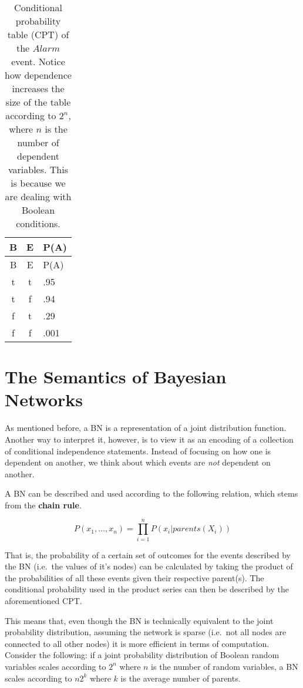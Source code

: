 \documentclass[
]{book}
\begin{document}
\hypertarget{tbl:cpt}{}
\begin{longtable}[]{@{}ccl@{}}
\caption{\label{tbl:cpt}Conditional probability table (CPT) of the
\(Alarm\) event. Notice how dependence increases the size of the table
according to \(2^n\), where \(n\) is the number of dependent variables.
This is because we are dealing with Boolean conditions.}\tabularnewline
\toprule\noalign{}
B & E & P(A) \\
\midrule\noalign{}
\endfirsthead
\toprule\noalign{}
B & E & P(A) \\
\midrule\noalign{}
\endhead
\bottomrule\noalign{}
\endlastfoot
t & t & .95 \\
t & f & .94 \\
f & t & .29 \\
f & f & .001 \\
\end{longtable}

\hypertarget{the-semantics-of-bayesian-networks}{%
\section{The Semantics of Bayesian
Networks}\label{the-semantics-of-bayesian-networks}}

As mentioned before, a BN is a representation of a joint distribution
function. Another way to interpret it, however, is to view it as an
encoding of a collection of conditional independence statements. Instead
of focusing on how one is dependent on another, we think about which
events are \emph{not} dependent on another.

A BN can be described and used according to the following relation,
which stems from the \textbf{chain rule}.

\[
P(x_1, \ldots, x_n) = \prod^n_{i=1} P(x_i|parents(X_i))
\]

That is, the probability of a certain set of outcomes for the events
described by the BN (i.e.~the values of it's nodes) can be calculated by
taking the product of the probabilities of all these events given their
respective parent(s). The conditional probability used in the product
series can then be described by the aforementioned CPT.

This means that, even though the BN is technically equivalent to the
joint probability distribution, assuming the network is sparse (i.e.~not
all nodes are connected to all other nodes) it is more efficient in
terms of computation. Consider the following: if a joint probability
distribution of Boolean random variables scales according to \(2^n\)
where \(n\) is the number of random variables, a BN scales according to
\(n2^k\) where \(k\) is the average number of parents.
\end{document}
